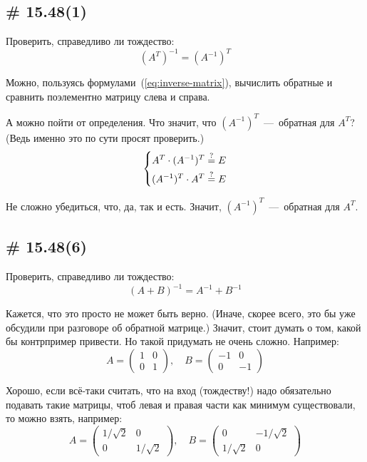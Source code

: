 \documentclass[a4paper,12pt]{article}
\theoremstyle{remark}
\begin{document}
  
  \subsection{\# 15.48(1)}
  
  Проверить, справедливо ли тождество:
  \[
    (A^T)^{-1} = (A^{-1})^T
  \]
  
  \begin{solution}
    Можно, пользуясь формулами~(\ref{eq:inverse-matrix}), вычислить обратные и сравнить поэлементно матрицу слева и справа.
    
    А можно пойти от определения.
    Что значит, что $(A^{-1})^T$~---~обратная для $A^T$?
    (Ведь именно это по сути просят проверить.)
    \[
      \left\{
        \begin{aligned}
          &A^T \cdot (A^{-1})^T \overset{\operatorname{?}}{=} E\\
          &(A^{-1})^T \cdot A^T \overset{\operatorname{?}}{=} E
        \end{aligned}
      \right.
    \]
    
    Не сложно убедиться, что, да, так и есть.
    Значит, $(A^{-1})^T$~---~обратная для $A^T$.
  \end{solution}
  
  
  \subsection{\# 15.48(6)}
  
  Проверить, справедливо ли тождество:
  \[
    (A + B)^{-1} = A^{-1} + B^{-1}
  \]
  
  \begin{solution}
    Кажется, что это просто не может быть верно.
    (Иначе, скорее всего, это бы уже обсудили при разговоре об обратной матрице.)
    Значит, стоит думать о том, какой бы контрпример привести.
    Но такой придумать не очень сложно.
    Например:
    \[
      A = \begin{pmatrix}
        1 & 0\\
        0 & 1
      \end{pmatrix}, \quad B = \begin{pmatrix}
        -1 & 0\\
        0 & -1
      \end{pmatrix}
    \]
    
    Хорошо, если всё-таки считать, что на вход (тождеству!) надо обязательно подавать такие матрицы, чтоб левая и правая части как минимум существовали, то можно взять, например:
    \[
      A = \begin{pmatrix}
        1/\sqrt{2} & 0\\
        0 & 1/\sqrt{2}
      \end{pmatrix}, \quad B = \begin{pmatrix}
        0 & -1/\sqrt{2}\\
        1/\sqrt{2} & 0
      \end{pmatrix}
    \]
  \end{solution}
  
\end{document}
